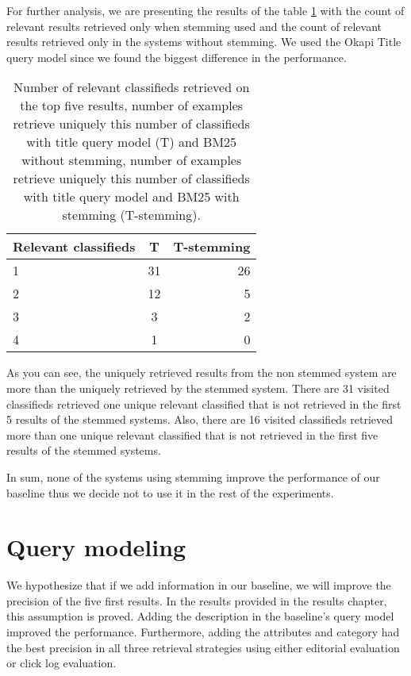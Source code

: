 For further analysis, we are presenting the results of the table \ref{table:stemmRelIrrel} with the count of relevant results retrieved only when stemming used and the count of relevant results retrieved only in the systems without stemming. We used the Okapi Title query model since we found the biggest difference in the performance.

\begin{table}[H]
\begin{center}
\caption{Number of relevant classifieds retrieved on the top five results, number of examples retrieve uniquely this number of classifieds with title query model (T) and BM25 without stemming, number of examples retrieve uniquely this number of classifieds with title query model and BM25 with stemming (T-stemming).}
\label{table:stemmRelIrrel}
\begin{tabular}{lcr}
\midrule
Relevant classifieds & T & T-stemming \\
\midrule
	1 & 31 & 26 \\
	2 & 12 & 5  \\
	3 & 3 & 2 \\
	4 & 1 & 0  \\
\bottomrule
\end{tabular}
\end{center}
\end{table}


As you can see, the uniquely retrieved results from the non stemmed system are more than the uniquely retrieved by the stemmed system. There are 31 visited classifieds retrieved one unique relevant classified that is not retrieved in the first 5 results of the stemmed systems. Also, there are 16 visited classifieds retrieved more than one unique relevant classified that is not retrieved in the first five results of the stemmed systems.

In sum, none of the systems using stemming improve the performance of our baseline thus we decide not to use it in the rest of the experiments.

\section{Query modeling}

We hypothesize that if we add information in our baseline, we will improve the precision of the five first results. In the results provided in the results chapter, this assumption is proved. Adding the description in the baseline's query model improved the performance. Furthermore, adding the attributes and category had the best precision in all three retrieval strategies using either editorial evaluation or click log evaluation.


